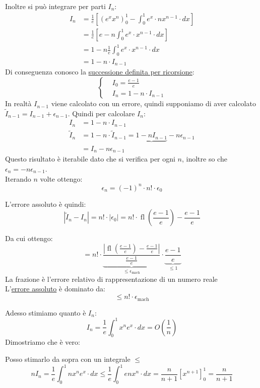 \documentclass{article}
\begin{document}
Inoltre si può integrare per parti $I_n$:
\begin{align*}
    I_n & =\frac{1}{e}\left[\left(e^xx^n\right)^1_0-\int^1_0 e^x\cdot nx^{n-1}\cdot dx\right] \\
        & =\frac{1}{e}\left[e-n\int^1_0 e^x\cdot x^{n-1}\cdot dx\right]                       \\
        & =1-n\frac{1}{e}\int_{0}^{1}e^x\cdot x^{n-1}\cdot dx                                 \\
        & =1-n\cdot I_{n-1}
\end{align*}
Di conseguenza conosco la \underline{successione definita per ricorsione}:
\[\boxed{\begin{cases}
             & I_0=\frac{e-1}{e}    \\
             & I_n=1-n\cdot I_{n-1}
        \end{cases}}\]
In realtà $I_{n-1}$ viene calcolato con un errore, quindi supponiamo di aver calcolato $\widetilde{I}_{n-1}=I_{n-1}+\epsilon_{n-1}$.
Quindi per calcolare $I_n$:
\begin{align*}
    I_n             & =1-n\cdot I_{n-1}                                                     \\
    \widetilde{I}_n & =1-n\cdot \widetilde{I}_{n-1}=\underbrace{1-nI_{n-1}}-n\epsilon_{n-1} \\
                    & =\boxed{I_n-n\epsilon_{n-1}}
\end{align*}
Questo risultato è iterabile dato che si verifica per ogni $n$, inoltre so che $\epsilon_n=-n\epsilon_{n-1}$.\\
Iterando $n$ volte ottengo:\[\boxed{\epsilon_n=(-1)^n\cdot n!\cdot\epsilon_0}\]

L'errore assoluto è quindi:\[|\widetilde{I}_n-I_n|=n!\cdot |\epsilon_0|=n!\cdot \operatorname{fl}\left(\frac{e-1}{e}\right)-\frac{e-1}{e}\]

Da cui ottengo:\[=n!\cdot\underbrace{\frac{|\operatorname{fl}\left(\frac{e-1}{e}\right)-\frac{e-1}{e}|}{\frac{e-1}{e}}}_{\le\epsilon_{\mathrm{mach}}}\cdot \underbrace{\frac{e-1}{e}}_{\le 1}\]
La frazione è l'errore relativo di rappresentazione di un numero reale\\
L'\underline{errore assoluto} è dominato da:
\[\boxed{\le n!\cdot\epsilon_{\mathrm{mach}}}\]

Adesso stimiamo quanto è $I_n$:
\[I_n=\frac{1}{e}\int_{0}^{1}x^ne^x\cdot dx=O(\frac{1}{n})\]
Dimostriamo che è vero:

Posso stimarlo da sopra con un integrale $\le$
\[nI_n=\frac{1}{e}\int_{0}^{1}nx^ne^x\cdot dx\le\frac{1}{e}\int_{0}^{1}enx^n\cdot dx=\frac{n}{n+1}\left[x^{n+1}\right]_0^1=\frac{n}{n+1}\]
\end{document}
